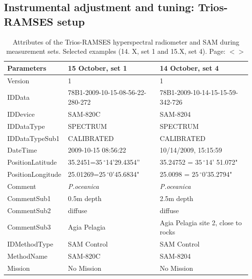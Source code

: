 \documentclass[11pt]{article}
\begin{document}
\begin{appendices}
\pagebreak

\subsection[Instrumental adjustment and tuning: Trios-RAMSES setup]{Instrumental adjustment and tuning: Trios-RAMSES setup}

\begin{table}[H]\footnotesize
	\caption{Attributes of the Trios-RAMSES hyperspectral radiometer and \ac{SAM} during measurement sets. Selected examples (14. X, set 1 and 15.X, set 4). Page: $<$\pageref{page-30}$>$}\label{tab:A.1}
	\centering
	  \begin{tabular}{| p{3cm} | p{3cm} | p{5cm} |}
		\hline
		    \textbf{Parameters} & \textbf{15 October, set 1} & \textbf{14 October, set 4} \\ \hline \hline
		     Version &1 & 1 \\ \hline
		     IDData & 78B1-2009-10-15-08-56-22-280-272 & 78B1-2009-10-14-15-15-59-342-726 \\ \hline
		     IDDevice & SAM-820C & SAM-8204\\ \hline
		     IDDataType & SPECTRUM & SPECTRUM \\ \hline
		     IDDataTypeSub1 & CALIBRATED & CALIBRATED \\ \hline
		     DateTime & 2009-10-15 08:56:22 & 10/14/2009, 15:15:59 \\ \hline
		     PositionLatitude & 35.2451=$35\,^{\circ}$14'29.4354” & 35.24752 = $35\,^{\circ}$14' 51.072" \\ \hline
		     PositionLongitude & 25.01269=$25\,^{\circ}$0'45.6834" & 25.0098 = $25\,^{\circ}$0'35.2794" \\ \hline
		     Comment & \textit{P.oceanica} & \textit{P.oceanica} \\ \hline
		     CommentSub1 & 0.5m depth & 2.5m depth \\ \hline
		     CommentSub2 & diffuse & diffuse \\ \hline
		     CommentSub3 & Agia Pelagia & Agia Pelagia site 2, close to rocks \\ \hline
		     IDMethodType & SAM Control & SAM Control \\ \hline
		    MethodName & SAM-820C & SAM-8204 \\ \hline
		    Mission & No Mission & No Mission \\ \hline

\end{tabular}
\end{table}
\end{appendices}
\end{document}
